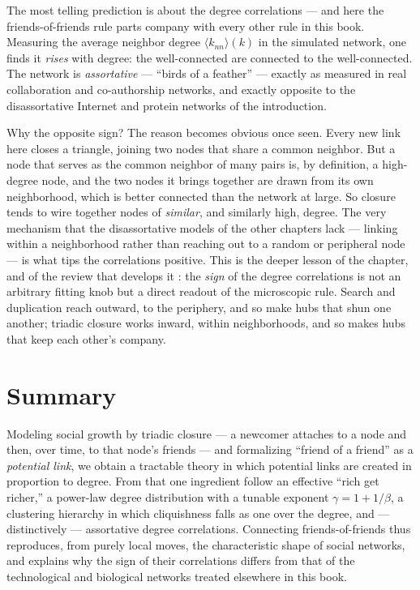 The most telling prediction is about the degree correlations --- and here the
friends-of-friends rule parts company with every other rule in this book.
Measuring the average neighbor degree $\langle k_{nn}\rangle(k)$ in the simulated
network, one finds it \emph{rises} with degree: the well-connected are connected
to the well-connected. The network is \emph{assortative}
\citep{newman2002} --- ``birds of a feather'' --- exactly as measured in real
collaboration and co-authorship networks, and exactly opposite to the
disassortative Internet and protein networks of the introduction.

Why the opposite sign? The reason becomes obvious once seen. Every new link here
closes a triangle, joining two nodes that share a common neighbor. But a node
that serves as the common neighbor of many pairs is, by definition, a high-degree
node, and the two nodes it brings together are drawn from its own neighborhood,
which is better connected than the network at large. So closure tends to wire
together nodes of \emph{similar}, and similarly high, degree. The very mechanism
that the disassortative models of the other chapters lack --- linking within a
neighborhood rather than reaching out to a random or peripheral node --- is what
tips the correlations positive. This is the deeper lesson of the chapter, and of
the review that develops it \citep{vazquez2025}: the \emph{sign} of the degree
correlations is not an arbitrary fitting knob but a direct readout of the
microscopic rule. Search and duplication reach outward, to the periphery, and so
make hubs that shun one another; triadic closure works inward, within
neighborhoods, and so makes hubs that keep each other's company.

\section{Summary}

Modeling social growth by triadic closure --- a newcomer attaches to a node and
then, over time, to that node's friends --- and formalizing ``friend of a friend''
as a \emph{potential link}, we obtain a tractable theory in which potential links
are created in proportion to degree. From that one ingredient follow an effective
``rich get richer,'' a power-law degree distribution with a tunable exponent
$\gamma = 1 + 1/\beta$, a clustering hierarchy in which cliquishness falls as one
over the degree, and --- distinctively --- assortative degree correlations.
Connecting friends-of-friends thus reproduces, from purely local moves, the
characteristic shape of social networks, and explains why the sign of their
correlations differs from that of the technological and biological networks
treated elsewhere in this book.
